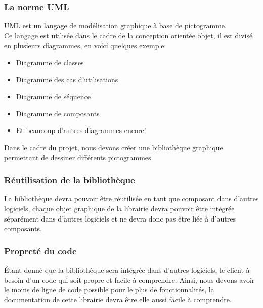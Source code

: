\documentclass[12pt,a4paper,openany]{article}
\begin{document}
		\subsubsection{La norme UML} 
			UML est un langage de modélisation graphique à base de pictogramme.\\
			Ce langage est utilisée dans le cadre de la conception orientée objet, il est divisé en plusieurs diagrammes, en voici quelques exemple: 
			\begin{itemize}
				\item Diagramme de classes
				\item Diagramme des cas d'utilisations
				\item Diagramme de séquence
				\item Diagramme de composants
				\item Et beaucoup d'autres diagrammes encore! 
			\end{itemize}
			Dans le cadre du projet, nous devons créer une bibliothèque graphique permettant de dessiner différents pictogrammes.
		\subsubsection{Réutilisation de la bibliothèque}
		La bibliothèque devra pouvoir être réutilisée en tant que composant dans d'autres logiciels,
		chaque objet graphique de la librairie devra pouvoir être intégrée séparément dans d'autres logiciels 
		et ne devra donc pas être liée à d'autres composants.
		\subsubsection{Propreté du code} Étant donné que la bibliothèque sera intégrée dans d'autres logiciels, le client
		à besoin d'un code qui soit propre et facile à comprendre. Ainsi, nous devons avoir le moins de ligne de code
		possible pour le plus de fonctionnalités, la documentation de cette librairie devra être elle aussi facile à comprendre.
\end{document}
